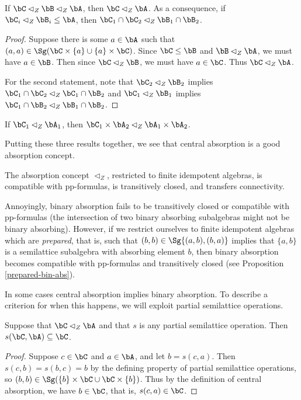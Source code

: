 \begin{prop} If $\bC \lhd_Z \bB \lhd_Z \bA$, then $\bC \lhd_Z \bA$. As a consequence, if $\bC_i \lhd_Z \bB_i \le \bA$, then $\bC_1 \cap \bC_2 \lhd_Z \bB_1 \cap \bB_2$.
\end{prop}
\begin{proof} Suppose there is some $a \in \bA$ such that $(a,a) \in \Sg(\bC\times \{a\} \cup \{a\}\times \bC)$. Since $\bC \le \bB$ and $\bB \lhd_Z \bA$, we must have $a \in \bB$. Then since $\bC \lhd_Z \bB$, we must have $a \in \bC$. Thus $\bC \lhd_Z \bA$.

For the second statement, note that $\bC_2 \lhd_Z \bB_2$ implies $\bC_1 \cap \bC_2 \lhd_Z \bC_1 \cap \bB_2$ and $\bC_1 \lhd_Z \bB_1$ implies $\bC_1\cap \bB_2 \lhd_Z \bB_1\cap\bB_2$.
\end{proof}

\begin{prop} If $\bC_1 \lhd_Z \bA_1$, then $\bC_1 \times \bA_2 \lhd_Z \bA_1 \times \bA_2$.
\end{prop}

Putting these three results together, we see that central absorption is a good absorption concept.

\begin{prop} The absorption concept $\lhd_Z$, restricted to finite idempotent algebras, is compatible with pp-formulas, is transitively closed, and transfers connectivity.
\end{prop}

\begin{rem} Annoyingly, binary absorption fails to be transitively closed or compatible with pp-formulas (the intersection of two binary absorbing subalgebras might not be binary absorbing). However, if we restrict ourselves to finite idempotent algebras which are \emph{prepared}, that is, such that $(b,b) \in \Sg\{(a,b),(b,a)\}$ implies that $\{a,b\}$ is a semilattice subalgebra with absorbing element $b$, then binary absorption becomes compatible with pp-formulas and transitively closed (see Proposition \ref{prepared-bin-abs}).
\end{rem}

In some cases central absorption implies binary absorption. To describe a criterion for when this happens, we will exploit partial semilattice operations.

\begin{prop}\label{prop-central-closed} Suppose that $\bC \lhd_Z \bA$ and that $s$ is any partial semilattice operation. Then $s(\bC,\bA) \subseteq \bC$.
\end{prop}
\begin{proof} Suppose $c \in \bC$ and $a \in \bA$, and let $b = s(c,a)$. Then $s(c,b) = s(b,c) = b$ by the defining property of partial semilattice operations, so $(b,b) \in \Sg(\{b\}\times \bC \cup \bC \times \{b\})$. Thus by the definition of central absorption, we have $b \in \bC$, that is, $s(c,a) \in \bC$.
\end{proof}

